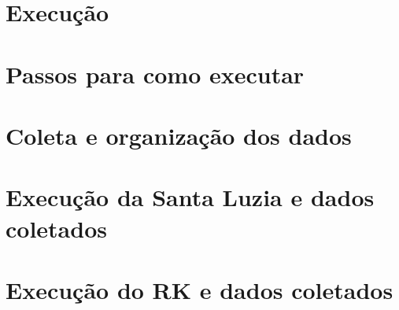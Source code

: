 \section{Execução}

\section{Passos para como executar}
\section{Coleta e organização dos dados}

\section{Execução da Santa Luzia e dados coletados}

\section{Execução do RK e dados coletados}



